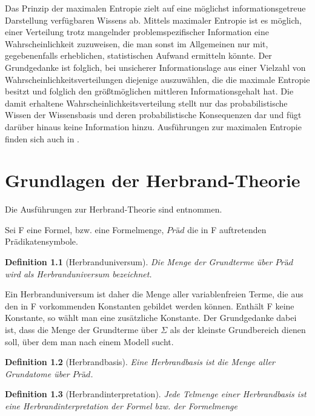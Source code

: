 \documentclass[a4paper, 11pt]{book}
\newtheorem{Def}{Definition }[section]
\begin{document}
{Das Prinzip der maximalen Entropie zielt auf eine möglichst informationsgetreue Darstellung verfügbaren Wissens ab. Mittels maximaler Entropie ist es möglich, einer Verteilung trotz mangelnder problemspezifischer Information eine Wahrscheinlichkeit zuzuweisen, die man sonst im Allgemeinen nur mit, gegebenenfalls erheblichen, statistischen Aufwand ermitteln könnte. Der Grundgedanke ist folglich, bei unsicherer Informationslage aus einer Vielzahl von Wahrscheinlichkeitsverteilungen diejenige auszuwählen, die die maximale Entropie besitzt und folglich den größtmöglichen mittleren Informationsgehalt hat. Die damit erhaltene Wahrscheinlichkeitsverteilung stellt nur das probabilistische Wissen der Wissensbasis und deren probabilistische Konsequenzen dar und fügt darüber hinaus keine Information hinzu.
Ausführungen zur maximalen Entropie finden sich auch in \cite{TFLKIB10}.

\chapter{Grundlagen der Herbrand-Theorie}
\label{Herb}
Die Ausführungen zur Herbrand-Theorie sind \cite{BKI08} entnommen.

Sei F eine Formel, bzw. eine Formelmenge, $ Präd $ die in F auftretenden Prädikatensymbole.
\begin{Def}[Herbranduniversum]
Die Menge der Grundterme über $ Präd $ wird als Herbranduniversum bezeichnet.
\end{Def} 
 Ein Herbranduniversum ist daher die Menge aller variablenfreien Terme, die aus den in F vorkommenden Konstanten gebildet werden können. Enthält F keine Konstante, so wählt man eine zusätzliche Konstante. Der Grundgedanke dabei ist, dass die Menge der Grundterme über $ \Sigma $ als der kleinste Grundbereich dienen soll, über dem man nach einem Modell sucht. 


\begin{Def}[Herbrandbasis] 
Eine Herbrandbasis ist die Menge aller Grundatome über $ Präd $.
\end{Def}


\begin{Def}[Herbrandinterpretation] 
Jede Telmenge einer Herbrandbasis ist eine Herbrandinterpretation der Formel bzw. der Formelmenge
\end{Def}


}
\end{document}
